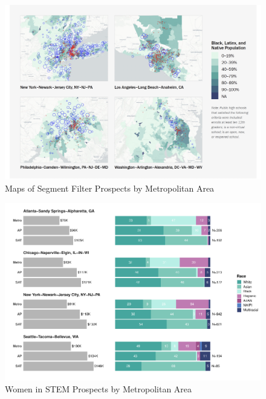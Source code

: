 \documentclass[
  12pt,
]{article}
\begin{document}
\pagebreak

\begin{landscape}

\begin{figure}

{\centering \includegraphics[width=1\linewidth]{./../../outputs/images/uiuc-map} 

}

\caption{Maps of Segment Filter Prospects by Metropolitan Area}\label{fig:uiuc-map}
\end{figure}

\end{landscape}

\pagebreak

\clearpage

\begin{figure}
\centering
\includegraphics{eepa_student_list_manuscript_c_a_files/figure-latex/ucsd-deep-dive-1.pdf}
\caption{\label{fig:ucsd-deep-dive}Women in STEM Prospects by Metropolitan Area}
\end{figure}
\end{document}
